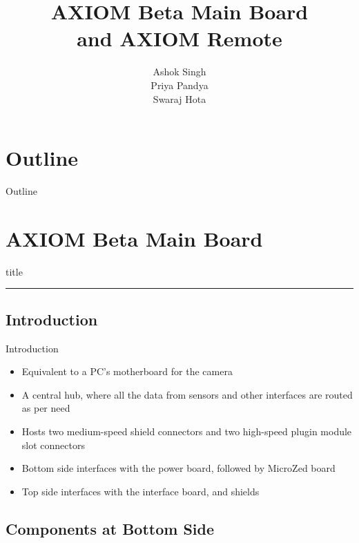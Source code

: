 \documentclass{beamer}
\title{AXIOM Beta Main Board \\ and AXIOM Remote}
\author{Ashok Singh \\ Priya Pandya \\ Swaraj Hota}
\date
\begin{document}
{
    \frame{\titlepage}
}

\section*{Outline}

\begin{frame}{Outline}
    \tableofcontents
\end{frame}

\section{AXIOM Beta Main Board}

\begin{frame}[plain]
    \begin{beamercolorbox}[sep=8pt,center,shadow=true,rounded=true]{title}
        \insertsectionhead\par
        \color{apertus_orange}\noindent\rule{10cm}{1pt}
    \end{beamercolorbox}
\end{frame}

\subsection{Introduction}

\begin{frame}{Introduction}
    \begin{itemize}
    \item Equivalent to a PC's motherboard for the camera
    \item A central hub, where all the data from sensors and other interfaces 
        are routed as per need
    \item Hosts two medium-speed shield connectors and two high-speed plugin module
        slot connectors
    \item Bottom side interfaces with the power board, followed by MicroZed board
    \item Top side interfaces with the interface board, and shields
    \end{itemize}
\end{frame}

\subsection{Components at Bottom Side}
\end{document}
